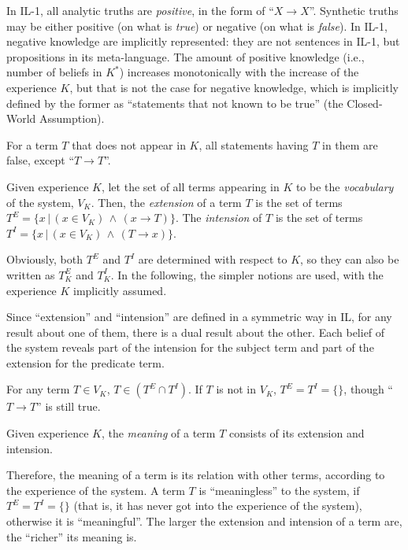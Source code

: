 In IL-1, all analytic truths are \emph{positive}, in the form of ``\(X \rightarrow X\)''.  Synthetic truths may be either positive (on what is \emph{true}) or negative (on what is \emph{false}). In IL-1, negative knowledge are implicitly represented: they are not sentences in IL-1, but propositions in its meta-language. The amount of positive knowledge (i.e., number of beliefs in $K^*$) increases monotonically with the increase of the experience $K$, but that is not the case for negative knowledge, which is implicitly defined by the former as ``statements that not known to be true'' (the Closed-World Assumption).

For a term $T$ that does not appear in $K$, all statements having $T$ in them are false, except ``\(T \rightarrow T\)''. 

\begin{defi}
Given experience $K$, let the set of all terms appearing in $K$ to be the {\em vocabulary} of the system, $V_K$.  Then, the {\em extension} of a term $T$ is the set of terms $T^E = \{x \, | \, (x \in V_K) \, \wedge \, (x \rightarrow T)\}$.  The {\em intension} of $T$ is the set of terms $T^I = \{x \, | \, (x \in V_K) \, \wedge \, (T \rightarrow x)\}$.
\end{defi}
Obviously, both $T^E$ and $T^I$ are determined with respect to $K$, so they can also be written as $T^E_K$ and $T^I_K$.  In the following, the simpler notions are used, with the experience $K$ implicitly assumed.

Since ``extension'' and ``intension'' are defined in a symmetric way in IL, for any result about one of them, there is a dual result about the other.  Each belief of the system reveals part of the intension for the subject term and part of the extension for the predicate term.

\begin{theo}
For any term $T \in V_K$, \(T \in (T^E \cap T^I)\).  If $T$ is not in $V_K$, \(T^E = T^I = \{\}\), though ``\(T \rightarrow T\)'' is still true.
\end{theo}

\begin{defi}
Given experience $K$, the {\em meaning} of a term $T$ consists of its extension and intension.
\end{defi}
Therefore, the meaning of a term is its relation with other terms, according to the experience of the system.  A term $T$ is ``meaningless'' to the system, if \(T^E = T^I = \{\}\) (that is, it has never got into the experience of the system), otherwise it is ``meaningful''. The larger the extension and intension of a term are, the ``richer'' its meaning is.

